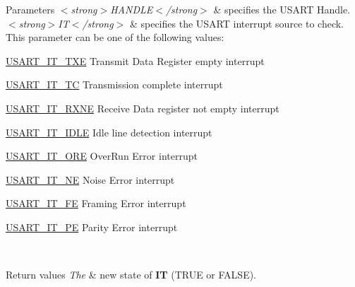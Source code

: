 \begin{DoxyParams}{Parameters}
{\em $<$strong$>$\+H\+A\+N\+D\+L\+E$<$/strong$>$} & specifies the U\+S\+A\+RT Handle. \\
\hline
{\em $<$strong$>$\+I\+T$<$/strong$>$} & specifies the U\+S\+A\+RT interrupt source to check. This parameter can be one of the following values\+: \begin{DoxyItemize}
\item \hyperlink{group___u_s_a_r_t___interrupt__definition_gab18d0fe889204a4c34f6d5817fb5147d}{U\+S\+A\+R\+T\+\_\+\+I\+T\+\_\+\+T\+XE} Transmit Data Register empty interrupt \item \hyperlink{group___u_s_a_r_t___interrupt__definition_ga748e86162cc110513330079982821c39}{U\+S\+A\+R\+T\+\_\+\+I\+T\+\_\+\+TC} Transmission complete interrupt \item \hyperlink{group___u_s_a_r_t___interrupt__definition_gacdd49b93072655a21a63a35e6431f8ae}{U\+S\+A\+R\+T\+\_\+\+I\+T\+\_\+\+R\+X\+NE} Receive Data register not empty interrupt \item \hyperlink{group___u_s_a_r_t___interrupt__definition_ga5d85aab24b7b2dfddb61ba2a49fa6185}{U\+S\+A\+R\+T\+\_\+\+I\+T\+\_\+\+I\+D\+LE} Idle line detection interrupt \item \hyperlink{group___u_s_a_r_t___interrupt__definition_ga8b7d40e02a81be787fbb325bbe6dfbeb}{U\+S\+A\+R\+T\+\_\+\+I\+T\+\_\+\+O\+RE} Over\+Run Error interrupt \item \hyperlink{group___u_s_a_r_t___interrupt__definition_gad5de042f579b50f1e8643009176486b3}{U\+S\+A\+R\+T\+\_\+\+I\+T\+\_\+\+NE} Noise Error interrupt \item \hyperlink{group___u_s_a_r_t___interrupt__definition_ga9af8790f78f6cb1591506c57d0cc0fb3}{U\+S\+A\+R\+T\+\_\+\+I\+T\+\_\+\+FE} Framing Error interrupt \item \hyperlink{group___u_s_a_r_t___interrupt__definition_gae607c28a462c224c575b7541dc4f7067}{U\+S\+A\+R\+T\+\_\+\+I\+T\+\_\+\+PE} Parity Error interrupt \end{DoxyItemize}
\\
\hline
\end{DoxyParams}

\begin{DoxyRetVals}{Return values}
{\em The} & new state of {\bfseries IT} (T\+R\+UE or F\+A\+L\+SE). \\
\hline
\end{DoxyRetVals}
\mbox{\label{group___u_s_a_r_t___exported___macros_ga3ab781c75a319bd41e4b64098259f018}} 
